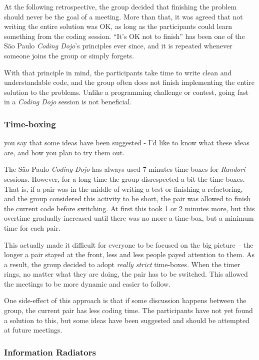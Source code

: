 At the following retrospective, the group decided that finishing the
problem should never be the goal of a meeting. More than that, it was
agreed that not writing the entire solution was OK, as long as the
participants could learn something from the coding session. ``It's OK
not to finish'' has been one of the São Paulo \emph{Coding Dojo}'s
principles ever since, and it is repeated whenever someone joins the
group or simply forgets.

With that principle in mind, the participants take time to write clean and
understandable code, and the group often does not finish implementing the
entire solution to the problems. Unlike a programming challenge or contest,
going fast in a \emph{Coding Dojo} session is not beneficial.

\subsubsection{Time-boxing}

{\Large you say that some ideas have been suggested - I'd like to know
  what these ideas are, and how you plan to try them out.}

The São Paulo \emph{Coding Dojo} has always used 7 minutes time-boxes
for \emph{Randori} sessions. However, for a long time the group
disrespected a bit the time-boxes. That is, if a pair was in the
middle of writing a test or finishing a refactoring, and the group
considered this activity to be short, the pair was allowed to finish
the current code before switching. At first this took 1 or 2 minutes
more, but this overtime gradually increased until there was no more a
time-box, but a minimum time for each pair.

This actually made it difficult for everyone to be focused on the big
picture -- the longer a pair stayed at the front, less and less people
payed attention to them. As a result, the group decided to adopt
\emph{really strict} time-boxes. When the timer rings, no matter
what they are doing, the pair has to be switched. This allowed the
meetings to be more dynamic and easier to follow.

One side-effect of this approach is that if some discussion happens
between the group, the current pair has less coding time. The
participants have not yet found a solution to this, but some ideas
have been suggested and should be attempted at future meetings.

\subsubsection{Information Radiators}

